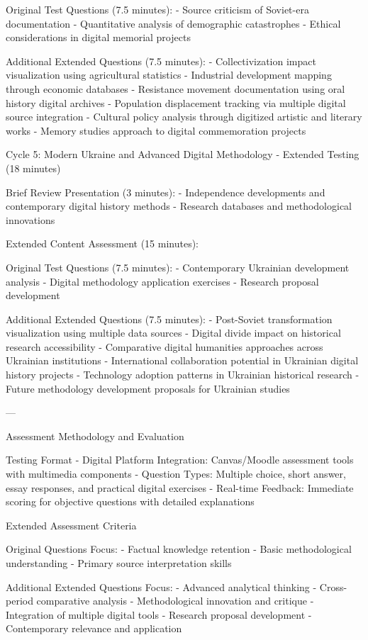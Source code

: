 Original Test Questions (7.5 minutes): 
- Source criticism of Soviet-era documentation
- Quantitative analysis of demographic catastrophes
- Ethical considerations in digital memorial projects

 Additional Extended Questions (7.5 minutes): 
- Collectivization impact visualization using agricultural statistics
- Industrial development mapping through economic databases
- Resistance movement documentation using oral history digital archives
- Population displacement tracking via multiple digital source integration
- Cultural policy analysis through digitized artistic and literary works
- Memory studies approach to digital commemoration projects

     Cycle 5: Modern Ukraine and Advanced Digital Methodology - Extended Testing (18 minutes) 

 Brief Review Presentation (3 minutes): 
- Independence developments and contemporary digital history methods
- Research databases and methodological innovations

 Extended Content Assessment (15 minutes): 

 Original Test Questions (7.5 minutes): 
- Contemporary Ukrainian development analysis
- Digital methodology application exercises
- Research proposal development

 Additional Extended Questions (7.5 minutes): 
- Post-Soviet transformation visualization using multiple data sources
- Digital divide impact on historical research accessibility
- Comparative digital humanities approaches across Ukrainian institutions
- International collaboration potential in Ukrainian digital history projects
- Technology adoption patterns in Ukrainian historical research
- Future methodology development proposals for Ukrainian studies

---

    Assessment Methodology and Evaluation 

     Testing Format 
-  Digital Platform Integration:  Canvas/Moodle assessment tools with multimedia components
-  Question Types:  Multiple choice, short answer, essay responses, and practical digital exercises
-  Real-time Feedback:  Immediate scoring for objective questions with detailed explanations

     Extended Assessment Criteria 

 Original Questions Focus: 
- Factual knowledge retention
- Basic methodological understanding
- Primary source interpretation skills

 Additional Extended Questions Focus: 
- Advanced analytical thinking
- Cross-period comparative analysis
- Methodological innovation and critique
- Integration of multiple digital tools
- Research proposal development
- Contemporary relevance and application


